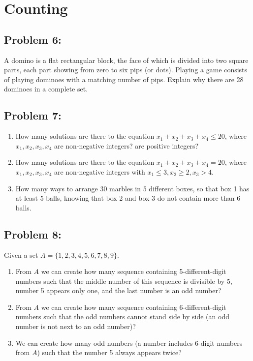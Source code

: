 \documentclass[12pt,en,a4paper]{article}
\begin{document}
\begin{titlepage}
\begin{center}
\begin{minipage}{0.4\textwidth}
\begin{flushright}
				\end{flushright}
			\end{minipage}
			
			\vfill
			
			\vspace{2cm}
			{\large} %
		\end{center}
	\end{titlepage}

	\section*{Counting}
	\subsection*{Problem 6:}
	A domino is a
flat rectangular block, the face of which is divided into two square parts, each part showing from zero to six pips (or dots). Playing a game consists of playing dominoes with a matching number of pips. Explain why there are 28 dominoes in a complete set.
	
	\subsection*{Problem 7:}
	\begin{enumerate}
		\item How many solutions are there to the equation $x_1 + x_2 + x_3 + x_4 \leq 20$, where $x_1, x_2, x_3, x_4$ are non-negative integers? are positive integers?
		\item How many solutions are there to the equation $x_1 + x_2 + x_3 + x_4 = 20$, where $x_1, x_2, x_3, x_4$ are non-negative integers with $x_1 \leq 3, x_2 \geq 2, x_3 > 4$.
		\item How many ways to arrange 30 marbles in 5 different boxes, so that box 1 has at least 5 balls, knowing that box 2 and box 3 do not contain more than 6 balls.
	\end{enumerate}
	
	\subsection*{Problem 8:}
	Given a set $A = \{1,2,3,4,5,6,7,8,9\}$.
	\begin{enumerate}
		\item From $A$ we can create how many sequence containing 5-different-digit numbers such that the middle number of this sequence is divisible by 5, number 5 appears only one, and the last number is an odd number?
		\item From $A$ we can create how many sequence containing 6-different-digit numbers such that the odd numbers cannot stand side by side (an odd number is not next to an odd number)?
		\item We can create how many odd numbers (a number includes 6-digit numbers from $A$) such that the number 5 always appears twice?
	\end{enumerate}
	
\end{document}
